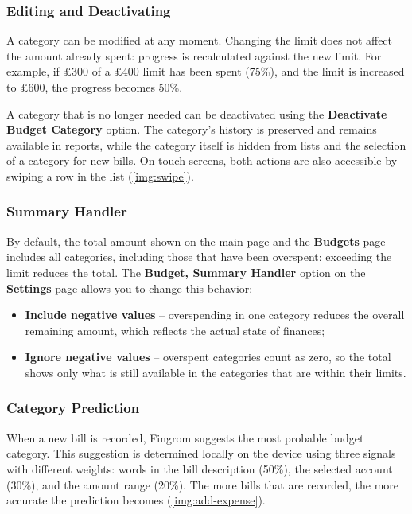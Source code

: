 \subsubsection{Editing and Deactivating}

A category can be modified at any moment. Changing the limit does not affect the amount
already spent: progress is recalculated against the new limit. For example, if £300 of a £400
limit has been spent (75\%), and the limit is increased to £600, the progress becomes 50\%.

\noindent A category that is no longer needed can be deactivated using the \textbf{Deactivate
Budget Category} option. The category's history is preserved and remains available in
reports, while the category itself is hidden from lists and the selection of a category for
new bills. On touch screens, both actions are also accessible by swiping a row in the list
(\cref{img:swipe}).



\subsubsection{Summary Handler}

By default, the total amount shown on the main page and the \textbf{Budgets} page includes
all categories, including those that have been overspent: exceeding the limit reduces the
total. The \textbf{Budget, Summary Handler} option on the \textbf{Settings} page allows you
to change this behavior:

\begin{itemize}
  \item \textbf{Include negative values} -- overspending in one category reduces the overall
  remaining amount, which reflects the actual state of finances;
  \item \textbf{Ignore negative values} -- overspent categories count as zero, so the total
  shows only what is still available in the categories that are within their limits.
\end{itemize}


\subsubsection{Category Prediction}

When a new bill is recorded, Fingrom suggests the most probable budget category. This
suggestion is determined locally on the device using three signals with different weights:
words in the bill description (50\%), the selected account (30\%), and the amount range
(20\%). The more bills that are recorded, the more accurate the prediction becomes
(\cref{img:add-expense}).

